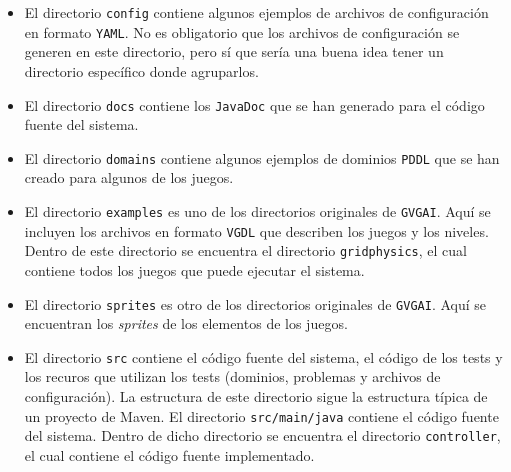 \documentclass[11pt,a4paper]{article}
\begin{document}
\begin{itemize}[label=\textbullet]
    \item El directorio \texttt{config} contiene algunos ejemplos de  archivos de configuración en formato
    \texttt{YAML}. No es obligatorio que los archivos de configuración se generen en este directorio, pero
    sí que sería una buena idea tener un directorio específico donde agruparlos.
    \item El directorio \texttt{docs} contiene los \texttt{JavaDoc} que se han generado para el código
    fuente del sistema.
    \item El directorio \texttt{domains} contiene algunos ejemplos de dominios \texttt{PDDL} que se han
    creado para algunos de los juegos.
    \item El directorio \texttt{examples} es uno de los directorios originales de \texttt{GVGAI}. Aquí
    se incluyen los archivos en formato \texttt{VGDL} que describen los juegos y los niveles. Dentro de
    este directorio se encuentra el directorio \texttt{gridphysics}, el cual contiene todos los juegos
    que puede ejecutar el sistema.
    \item El directorio \texttt{sprites} es otro de los directorios originales de \texttt{GVGAI}. Aquí se
    encuentran los \textit{sprites} de los elementos de los juegos.
    \item El directorio \texttt{src} contiene el código fuente del sistema, el código de los tests y los
    recuros que utilizan los tests (dominios, problemas y archivos de configuración). La
    estructura de este directorio sigue la estructura típica de un proyecto de Maven. El directorio
    \texttt{src/main/java} contiene el código fuente del sistema. Dentro de dicho directorio se encuentra
    el directorio \texttt{controller}, el cual contiene el código fuente implementado.
    
    \begin{figure}[H]


\end{figure}
\end{itemize}
\end{document}
